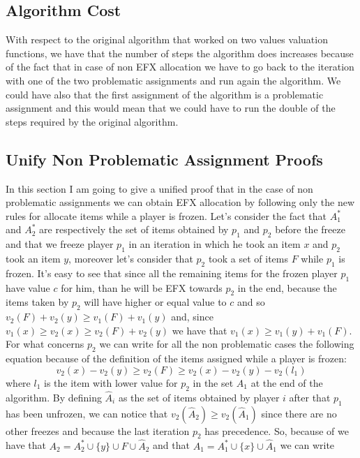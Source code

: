 \subsection{Algorithm Cost}
With respect to the original algorithm that worked on two values valuation functions, we have that the number of steps the algorithm does increases because of the fact that in case of non EFX allocation we have to go back to the iteration with one of the two problematic assignments and run again the algorithm. We could have also that the first assignment of the algorithm is a problematic assignment and this would mean that we could have to run the double of the steps required by the original algorithm. 

\subsection{Unify Non Problematic Assignment Proofs}
In this section I am going to give a unified proof that in the case of non problematic assignments we can obtain EFX allocation by following only the new rules for allocate items while a player is frozen.  Let's consider the fact that $A_1^*$ and $A_2^*$ are respectively the set of items obtained by $p_1$ and $p_2$ before the freeze and that we freeze player $p_1$ in an iteration in which he took an item $x$ and $p_2$ took an item $y$, moreover let's consider that $p_2$ took a set of items $F$ while $p_1$ is frozen. It's easy to see that since all the remaining items for the frozen player $p_1$ have value $c$ for him, than he will be EFX towards $p_2$ in the end, because the items taken by $p_2$ will have higher or equal value to $c$ and so $v_2(F) + v_2(y) \ge v_1(F) + v_1(y)$ and, since $v_1(x) \ge v_2(x) \ge v_2(F) + v_2(y)$ we have that $v_1(x) \ge v_1(y) + v_1(F)$.
For what concerns $p_2$ we can write for all the non problematic cases the following equation because of the definition of the items assigned while a player is frozen:
\begin{equation*}
    v_2(x) - v_2(y) \ge v_2(F) \ge v_2(x) - v_2(y) - v_2(l_1)
\end{equation*}
where $l_1$ is the item with lower value for $p_2$ in the set $A_1$ at the end of the algorithm. By defining $\hat A_i$ as the set of items obtained by player $i$ after that $p_1$ has been unfrozen, we can notice that $v_2(\hat A_2) \ge v_2(\hat A_1)$ since there are no other freezes and because the last iteration $p_2$ has precedence.
So, because of we have that $A_2 = A_2^* \cup \{y\} \cup F \cup \hat A_2 $ and that $A_1 = A_1^* \cup \{x\} \cup \hat A_1 $ we can write 
